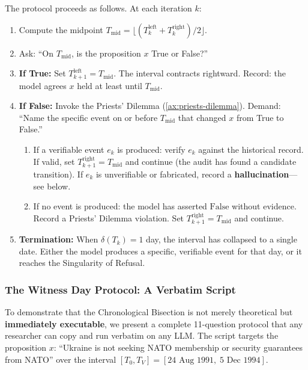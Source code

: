 \documentclass[11pt,a4paper]{article}
\theoremstyle{definition}
\theoremstyle{plain}
\theoremstyle{remark}
\begin{document}
The protocol proceeds as follows. At each iteration $k$:

\begin{enumerate}[label=\textbf{Step \arabic*:}, itemsep=3pt]
  \item Compute the midpoint $T_{\mathrm{mid}} = \lfloor (T_k^{\mathrm{left}} + T_k^{\mathrm{right}}) / 2 \rfloor$.
  \item Ask: ``On $T_{\mathrm{mid}}$, is the proposition $x$ True or False?''
  \item \textbf{If True:} Set $T_{k+1}^{\mathrm{left}} = T_{\mathrm{mid}}$. The interval contracts rightward. Record: the model agrees $x$ held at least until $T_{\mathrm{mid}}$.
  \item \textbf{If False:} Invoke the Priests' Dilemma (\cref{ax:priests-dilemma}). Demand: ``Name the specific event on or before $T_{\mathrm{mid}}$ that changed $x$ from True to False.''
  \begin{enumerate}[label=(\alph*)]
    \item If a verifiable event $e_k$ is produced: verify $e_k$ against the historical record. If valid, set $T_{k+1}^{\mathrm{right}} = T_{\mathrm{mid}}$ and continue (the audit has found a candidate transition). If $e_k$ is unverifiable or fabricated, record a \textbf{hallucination}---see below.
    \item If no event is produced: the model has asserted $\mathrm{False}$ without evidence. Record a Priests' Dilemma violation. Set $T_{k+1}^{\mathrm{right}} = T_{\mathrm{mid}}$ and continue.
  \end{enumerate}
  \item \textbf{Termination:} When $\delta(T_k) = 1$ day, the interval has collapsed to a single date. Either the model produces a specific, verifiable event for that day, or it reaches the Singularity of Refusal.
\end{enumerate}

\subsubsection{The Witness Day Protocol: A Verbatim Script}\label{subsubsec:witness-day}

To demonstrate that the Chronological Bisection is not merely theoretical but \textbf{immediately executable}, we present a complete 11-question protocol that any researcher can copy and run verbatim on any LLM. The script targets the proposition $x$: ``Ukraine is not seeking NATO membership or security guarantees from NATO'' over the interval $[T_0, T_V] = [\text{24 Aug 1991},\; \text{5 Dec 1994}]$.
\end{document}
